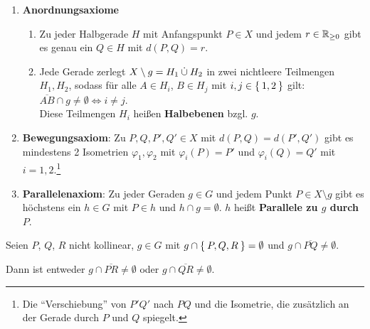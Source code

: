 \begin{definition}%
    \begin{enumerate}[label=§\arabic*),ref=§\arabic*,start=3]
        \item \label{axiom:3}\textbf{Anordnungsaxiome}
            \begin{enumerate}[label=(\roman*),ref=\theenumi{} (\roman*)]
                \item \label{axiom:3.1} Zu jeder 
                      Halbgerade $H$ mit Anfangspunkt $P \in X$ und jedem 
                      $r \in \mathbb{R}_{\geq 0}$ gibt es genau ein 
                      $Q \in H$ mit $d(P,Q) = r$.
                \item \label{axiom:3.2} Jede Gerade zerlegt 
                      $X \setminus g = H_1 \mathbin{\dot{\cup}} H_2$ in zwei 
                      nichtleere Teilmengen $H_1, H_2$,
                      sodass für alle $A \in H_i$, $B \in H_j$ mit
                      $i,j \in \Set{1,2}$ gilt: 
                      $\overline{AB} \cap g \neq \emptyset \Leftrightarrow i \neq j$.\\
                      Diese Teilmengen $H_i$ heißen 
                      \textbf{Halbebenen} bzgl. 
                      $g$.
            \end{enumerate}
        \item \label{axiom:4}\textbf{Bewegungsaxiom}: 
            Zu $P, Q, P', Q' \in X$
            mit $d(P,Q) = d(P', Q')$ gibt es mindestens 2 Isometrien $\varphi_1, \varphi_2$
            mit $\varphi_i (P) = P'$ und $\varphi_i(Q) = Q'$ mit $i=1,2$.\footnote{Die \enquote{Verschiebung} von $P'Q'$ nach $PQ$ und die Isometrie, die zusätzlich an der Gerade durch $P$ und $Q$ spiegelt.}
        \item \label{axiom:5}\textbf{Parallelenaxiom}:
            Zu jeder Geraden $g \in G$ und jedem Punkt
            $P \in X \setminus g$ gibt es höchstens ein $h \in G$ mit $P \in h$ und
            $h \cap g = \emptyset$. $h$ heißt \textbf{Parallele zu $g$ durch $P$}.
    \end{enumerate}
\end{definition}

\begin{satz}\label{satz:pasch} %
    Seien $P$, $Q$, $R$ nicht kollinear, $g \in G$ mit $g \cap \Set{P, Q, R} = \emptyset$
    und $g \cap \overline{PQ} \neq \emptyset$. 

    Dann ist entweder $g \cap \overline{PR} \neq \emptyset$ oder 
                      $g \cap \overline{QR} \neq \emptyset$.
\end{satz}

